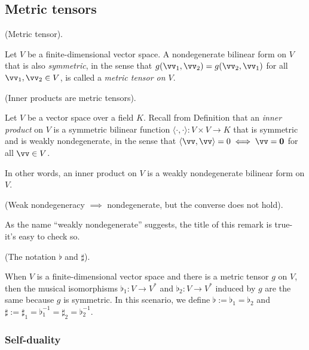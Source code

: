 \subsection*{Metric tensors}

\begin{defn}
    (Metric tensor).
    
    Let $V$ be a finite-dimensional vector space. A nondegenerate bilinear form on $V$ that is also \textit{symmetric}, in the sense that $g(\vv_1, \vv_2) = g(\vv_2, \vv_1)$ for all $\vv_1, \vv_2 \in V$, is called a \textit{metric tensor on $V$}.
\end{defn}

\begin{remark}
    (Inner products are metric tensors).
    
    Let $V$ be a vector space over a field $K$. Recall from Definition     \label{ch::lin_alg::defn::inner_product} that an \textit{inner product} on $V$ is a symmetric bilinear function $\langle \cdot, \cdot \rangle: V \times V \rightarrow K$ that is symmetric and is weakly nondegenerate, in the sense that $\langle \vv, \vv \rangle = 0 \iff \vv = \mathbf{0}$ for all $\vv \in V$.

    In other words, an inner product on $V$ is a weakly nondegenerate bilinear form on $V$.
\end{remark}

\begin{remark}
    (Weak nondegeneracy $\implies$ nondegenerate, but the converse does not hold).
    
    As the name ``weakly nondegenerate'' suggests, the title of this remark is true- it's easy to check so.
\end{remark}

\begin{defn}
    (The notation $\flat$ and $\sharp$).
    
    When $V$ is a finite-dimensional vector space and there is a metric tensor $g$ on $V$, then the musical isomorphisms ${\flat_1:V \rightarrow V^*}$ and ${\flat_2:V \rightarrow V^*}$ induced by $g$ are the same because $g$ is symmetric. In this scenario, we define $\flat := \flat_1 = \flat_2$ and $\sharp := \sharp_1 = \flat_1^{-1} = \sharp_2 = \flat_2^{-1}$.
\end{defn}

\subsubsection*{Self-duality}

